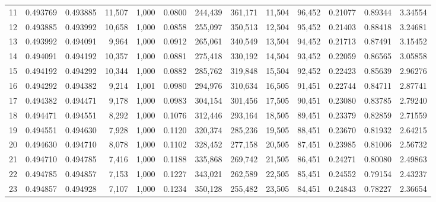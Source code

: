 \begin{tabular}{rrrrrrrrrrrrr}
11  &  0.493769 &  0.493885 &  11,507 &  1,000 &                                     0.0800 &  244,439 &  361,171 &   11,504 &   96,452 &  0.21077 &  0.89344 &  3.34554 \\
12  &  0.493885 &  0.493992 &  10,658 &  1,000 &                                     0.0858 &  255,097 &  350,513 &   12,504 &   95,452 &  0.21403 &  0.88418 &  3.24681 \\
13  &  0.493992 &  0.494091 &   9,964 &  1,000 &                                     0.0912 &  265,061 &  340,549 &   13,504 &   94,452 &  0.21713 &  0.87491 &  3.15452 \\
14  &  0.494091 &  0.494192 &  10,357 &  1,000 &                                     0.0881 &  275,418 &  330,192 &   14,504 &   93,452 &  0.22059 &  0.86565 &  3.05858 \\
15  &  0.494192 &  0.494292 &  10,344 &  1,000 &                                     0.0882 &  285,762 &  319,848 &   15,504 &   92,452 &  0.22423 &  0.85639 &  2.96276 \\
16  &  0.494292 &  0.494382 &   9,214 &  1,001 &                                     0.0980 &  294,976 &  310,634 &   16,505 &   91,451 &  0.22744 &  0.84711 &  2.87741 \\
17  &  0.494382 &  0.494471 &   9,178 &  1,000 &                                     0.0983 &  304,154 &  301,456 &   17,505 &   90,451 &  0.23080 &  0.83785 &  2.79240 \\
18  &  0.494471 &  0.494551 &   8,292 &  1,000 &                                     0.1076 &  312,446 &  293,164 &   18,505 &   89,451 &  0.23379 &  0.82859 &  2.71559 \\
19  &  0.494551 &  0.494630 &   7,928 &  1,000 &                                     0.1120 &  320,374 &  285,236 &   19,505 &   88,451 &  0.23670 &  0.81932 &  2.64215 \\
20  &  0.494630 &  0.494710 &   8,078 &  1,000 &                                     0.1102 &  328,452 &  277,158 &   20,505 &   87,451 &  0.23985 &  0.81006 &  2.56732 \\
21  &  0.494710 &  0.494785 &   7,416 &  1,000 &                                     0.1188 &  335,868 &  269,742 &   21,505 &   86,451 &  0.24271 &  0.80080 &  2.49863 \\
22  &  0.494785 &  0.494857 &   7,153 &  1,000 &                                     0.1227 &  343,021 &  262,589 &   22,505 &   85,451 &  0.24552 &  0.79154 &  2.43237 \\
23  &  0.494857 &  0.494928 &   7,107 &  1,000 &                                     0.1234 &  350,128 &  255,482 &   23,505 &   84,451 &  0.24843 &  0.78227 &  2.36654 \\

\end{tabular}

